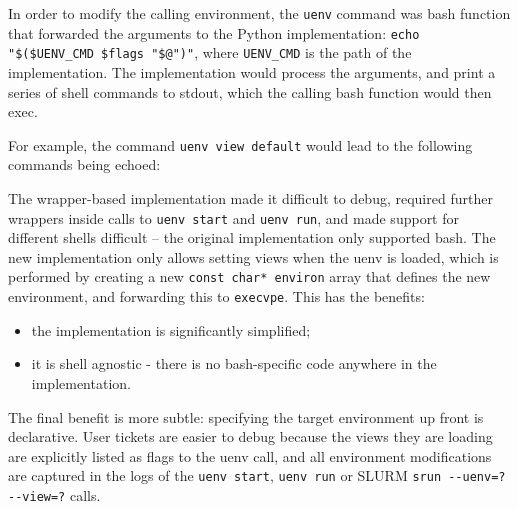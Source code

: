 In order to modify the calling environment, the \lstinline{uenv} command was bash function that forwarded the arguments to the Python implementation: \lstinline{echo "$($UENV_CMD $flags "$@")"}, where \lstinline{UENV_CMD} is the path of the implementation.
The implementation would process the arguments, and print a series of shell commands to stdout, which the calling bash function would then exec.

For example, the command \lstinline{uenv view default} would lead to the following commands being echoed:


The wrapper-based implementation made it difficult to debug, required further wrappers inside calls to \lstinline{uenv start} and \lstinline{uenv run}, and made support for different shells difficult -- the original implementation only supported bash.
The new implementation only allows setting views when the uenv is loaded, which is performed by creating a new \lstinline{const char* environ} array that defines the new environment, and forwarding this to \lstinline{execvpe}.
This has the benefits:
\begin{itemize}
    \item the implementation is significantly simplified;
    \item it is shell agnostic - there is no bash-specific code anywhere in the implementation.
\end{itemize}

The final benefit is more subtle: specifying the target environment up front is declarative.
User tickets are easier to debug because the views they are loading are explicitly listed as flags to the uenv call, and all environment modifications are captured in the logs of the \lstinline{uenv start}, \lstinline{uenv run} or SLURM \lstinline{srun --uenv=? --view=?} calls.
